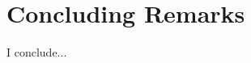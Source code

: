 \documentclass[main.tex]{subfiles}
\begin{document}
\chapter{Concluding Remarks}

I conclude...
\end{document}
